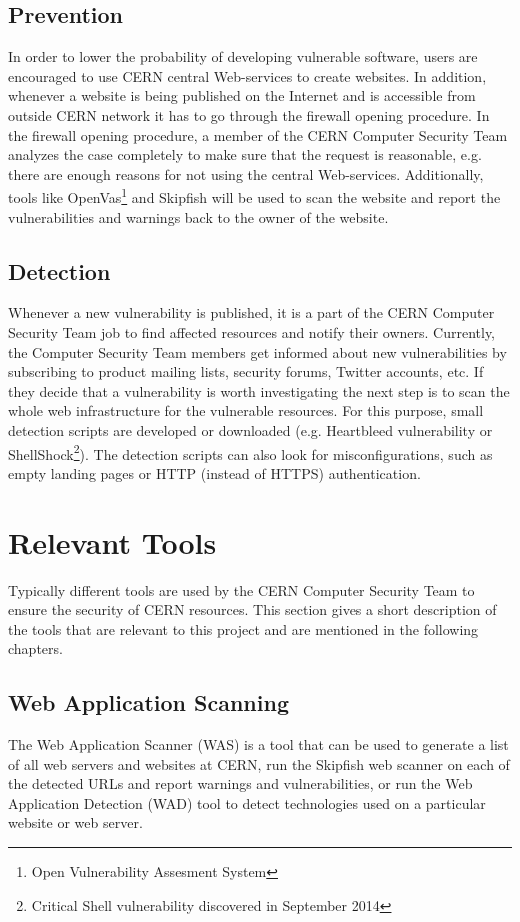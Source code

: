 \subsection{Prevention}
In order to lower the probability of developing vulnerable software, users are encouraged to use CERN central Web-services to create websites. In addition, whenever a website is being published on the Internet and is accessible from outside CERN network it has to go through the firewall opening procedure. In the firewall opening procedure, a member of the CERN Computer Security Team analyzes the case completely to make sure that the request is reasonable, e.g. there are enough reasons for not using the central Web-services. Additionally, tools like OpenVas\footnote{Open Vulnerability Assesment System} and Skipfish will be used to scan the website and report the vulnerabilities and warnings back to the owner of the website. 

\subsection{Detection}
Whenever a new vulnerability is published, it is a part of the CERN Computer Security Team job to find affected resources and notify their owners. Currently, the Computer Security Team members get informed about new vulnerabilities by subscribing to product mailing lists, security forums, Twitter accounts, etc. If they decide that a vulnerability is worth investigating the next step is to scan the whole web infrastructure for the vulnerable resources. For this purpose, small detection scripts are developed or downloaded (e.g. Heartbleed vulnerability or ShellShock\footnote{Critical Shell vulnerability discovered in September 2014}). The detection scripts can also look for misconfigurations, such as empty landing pages or HTTP (instead of HTTPS) authentication. 


\section{Relevant Tools}
\label{sec:tools}
Typically different tools are used by the CERN Computer Security Team to ensure the security of CERN resources. This section gives a short description of the tools that are relevant to this project and are mentioned in the following chapters. 
\subsection{Web Application Scanning} 
The Web Application Scanner (WAS) is a tool that can be used to generate a list of all web servers and websites at CERN, run the Skipfish web scanner on each of the detected URLs and report warnings and vulnerabilities, or run the Web Application Detection (WAD) tool to detect technologies used on a particular website or web server.
